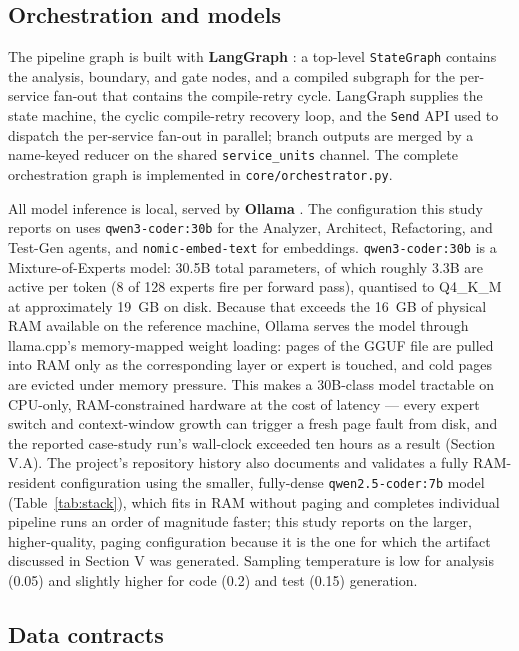 \documentclass[conference]{IEEEtran}
\begin{document}
\subsection{Orchestration and models}

The pipeline graph is built with \textbf{LangGraph} \cite{langgraph2024}: a top-level \texttt{StateGraph} contains the analysis, boundary, and gate nodes, and a compiled subgraph for the per-service fan-out that contains the compile-retry cycle. LangGraph supplies the state machine, the cyclic compile-retry recovery loop, and the \texttt{Send} API used to dispatch the per-service fan-out in parallel; branch outputs are merged by a name-keyed reducer on the shared \texttt{service\_units} channel. The complete orchestration graph is implemented in \texttt{core/orchestrator.py}.

All model inference is local, served by \textbf{Ollama} \cite{ollama2024}. The configuration this study reports on uses \texttt{qwen3-coder:30b} for the Analyzer, Architect, Refactoring, and Test-Gen agents, and \texttt{nomic-embed-text} for embeddings. \texttt{qwen3-coder:30b} is a Mixture-of-Experts model: 30.5B total parameters, of which roughly 3.3B are active per token (8 of 128 experts fire per forward pass), quantised to Q4\_K\_M at approximately 19~GB on disk. Because that exceeds the 16~GB of physical RAM available on the reference machine, Ollama serves the model through llama.cpp's memory-mapped weight loading: pages of the GGUF file are pulled into RAM only as the corresponding layer or expert is touched, and cold pages are evicted under memory pressure. This makes a 30B-class model tractable on CPU-only, RAM-constrained hardware at the cost of latency --- every expert switch and context-window growth can trigger a fresh page fault from disk, and the reported case-study run's wall-clock exceeded ten hours as a result (Section V.A). The project's repository history also documents and validates a fully RAM-resident configuration using the smaller, fully-dense \texttt{qwen2.5-coder:7b} model (Table~\ref{tab:stack}), which fits in RAM without paging and completes individual pipeline runs an order of magnitude faster; this study reports on the larger, higher-quality, paging configuration because it is the one for which the artifact discussed in Section V was generated. Sampling temperature is low for analysis (0.05) and slightly higher for code (0.2) and test (0.15) generation.

\subsection{Data contracts}
\end{document}
